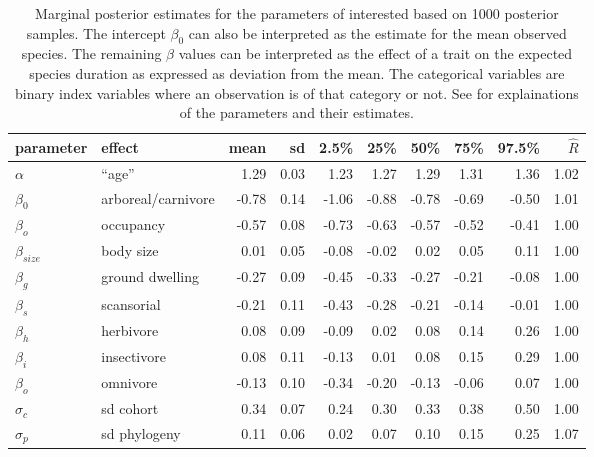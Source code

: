 \documentclass{article}
\begin{document}
\begin{table}[c]
  \centering
  \caption{Marginal posterior estimates for the parameters of interested based on 1000 posterior samples. The intercept \(\beta_{0}\) can also be interpreted as the estimate for the mean observed species. The remaining \(\beta\) values can be interpreted as the effect of a trait on the expected species duration as expressed as deviation from the mean. The categorical variables are binary index variables where an observation is of that category or not. See \citet{Smits2015} for explainations of the parameters and their estimates.}
  \begin{tabular}{ l l r r r r r r r r }
    parameter & effect & mean & sd & 2.5\% & 25\% & 50\% & 75\% & 97.5\% & \(\hat{R}\) \\ 
    \hline
    \(\alpha\) & ``age'' &1.29 & 0.03 & 1.23 & 1.27 & 1.29 & 1.31 & 1.36 & 1.02 \\ 
    \hline
    \(\beta_{0}\) & arboreal/carnivore & -0.78 & 0.14 & -1.06 & -0.88 & -0.78 & -0.69 & -0.50 & 1.01 \\ 
    \(\beta_{o}\) & occupancy & -0.57 & 0.08 & -0.73 & -0.63 & -0.57 & -0.52 & -0.41 & 1.00 \\ 
    \(\beta_{size}\) & body size & 0.01 & 0.05 & -0.08 & -0.02 & 0.02 & 0.05 & 0.11 & 1.00 \\ 
    \(\beta_{g}\) & ground dwelling & -0.27 & 0.09 & -0.45 & -0.33 & -0.27 & -0.21 & -0.08 & 1.00 \\ 
    \(\beta_{s}\) & scansorial & -0.21 & 0.11 & -0.43 & -0.28 & -0.21 & -0.14 & -0.01 & 1.00 \\ 
    \(\beta_{h}\) & herbivore & 0.08 & 0.09 & -0.09 & 0.02 & 0.08 & 0.14 & 0.26 & 1.00 \\ 
    \(\beta_{i}\) & insectivore & 0.08 & 0.11 & -0.13 & 0.01 & 0.08 & 0.15 & 0.29 & 1.00 \\ 
    \(\beta_{o}\) & omnivore & -0.13 & 0.10 & -0.34 & -0.20 & -0.13 & -0.06 & 0.07 & 1.00 \\ 
    \hline
    \(\sigma_{c}\) & sd cohort & 0.34 & 0.07 & 0.24 & 0.30 & 0.33 & 0.38 & 0.50 & 1.00 \\ 
    \(\sigma_{p}\) & sd phylogeny & 0.11 & 0.06 & 0.02 & 0.07 & 0.10 & 0.15 & 0.25 & 1.07 \\ 
    \hline
  \end{tabular}
  \label{tab:new_res}
\end{table}



\pagebreak 


%

\end{document}
